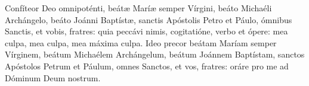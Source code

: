 Confíteor Deo omnipoténti, beátæ Maríæ semper Vírgini, 
beáto Michaéli Archángelo, beáto Joánni Baptístæ, 
sanctis Apóstolis Petro et Páulo, 
ómnibus Sanctis, et vobis, fratres: 
quia peccávi nimis, cogitatióne, verbo et ópere: 
mea culpa, mea culpa, mea máxima culpa. 
Ideo precor beátam Maríam semper Vírginem, 
beátum Michaélem Archángelum, 
beátum Joánnem Baptístam, 
sanctos Apóstolos Petrum et Páulum, 
omnes Sanctos, et vos, fratres: 
oráre pro me ad Dóminum Deum nostrum.
